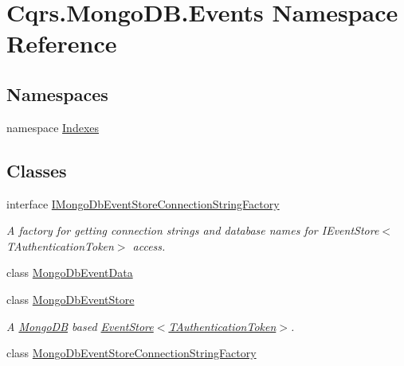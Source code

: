 \hypertarget{namespaceCqrs_1_1MongoDB_1_1Events}{}\section{Cqrs.\+Mongo\+D\+B.\+Events Namespace Reference}
\label{namespaceCqrs_1_1MongoDB_1_1Events}
\subsection*{Namespaces}
\begin{DoxyCompactItemize}
\item 
namespace \hyperlink{namespaceCqrs_1_1MongoDB_1_1Events_1_1Indexes}{Indexes}
\end{DoxyCompactItemize}
\subsection*{Classes}
\begin{DoxyCompactItemize}
\item 
interface \hyperlink{interfaceCqrs_1_1MongoDB_1_1Events_1_1IMongoDbEventStoreConnectionStringFactory}{I\+Mongo\+Db\+Event\+Store\+Connection\+String\+Factory}
\begin{DoxyCompactList}\small\item\em A factory for getting connection strings and database names for I\+Event\+Store$<$\+T\+Authentication\+Token$>$ access. \end{DoxyCompactList}\item 
class \hyperlink{classCqrs_1_1MongoDB_1_1Events_1_1MongoDbEventData}{Mongo\+Db\+Event\+Data}
\item 
class \hyperlink{classCqrs_1_1MongoDB_1_1Events_1_1MongoDbEventStore}{Mongo\+Db\+Event\+Store}
\begin{DoxyCompactList}\small\item\em A \hyperlink{namespaceCqrs_1_1MongoDB}{Mongo\+DB} based \hyperlink{classCqrs_1_1Events_1_1EventStore_a6346cb2aea4c5b4e740dc6cfb15abab8_a6346cb2aea4c5b4e740dc6cfb15abab8}{Event\+Store$<$\+T\+Authentication\+Token$>$}. \end{DoxyCompactList}\item 
class \hyperlink{classCqrs_1_1MongoDB_1_1Events_1_1MongoDbEventStoreConnectionStringFactory}{Mongo\+Db\+Event\+Store\+Connection\+String\+Factory}
\end{DoxyCompactItemize}
